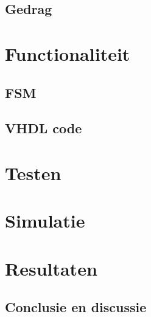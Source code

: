 \subsection{Gedrag}

\section{Functionaliteit}

\subsection{FSM}


\subsection{VHDL code}

\section{Testen}

\section{Simulatie}

\section{Resultaten}

\subsection{Conclusie en discussie}

